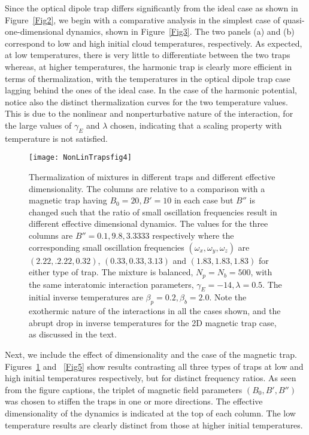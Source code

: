 \documentclass[pra,letterpaper,onecolumn,superscriptaddress,floatfix]{revtex4}
\begin{document}
Since the optical dipole trap differs significantly from the ideal case as shown in Figure~\ref{Fig2}, we begin 
with a comparative analysis in the simplest case of quasi-one-dimensional dynamics, shown in Figure~\ref{Fig3}.
The two panels (a) and (b) correspond to low and high initial cloud temperatures, respectively. 
As expected, at low temperatures, there is very little to differentiate between the two traps whereas, at higher 
temperatures, the harmonic trap is clearly more efficient in terms of thermalization, with the temperatures in 
the optical dipole trap case lagging behind the ones of the ideal case.  
In the case of the harmonic potential, notice also the distinct thermalization curves for the two temperature values. 
This is due to the nonlinear and nonperturbative nature of the interaction, for the large values of 
$\gamma_E$ and $\lambda$ chosen, indicating that a scaling property with temperature is not satisfied.

\begin{figure}[t]
\texttt{[image: NonLinTrapsfig4]}
\caption{Thermalization of mixtures in different traps and different effective dimensionality. 
The columns are relative to a comparison with a magnetic trap having $B_0=20, B'=10$ in each case but $B''$ is changed
such that the ratio of small oscillation frequencies result in different effective dimensional dynamics. The values
for the three columns are $B''=0.1, 9.8, 3.3333$ respectively where the corresponding small oscillation frequencies 
$(\omega_x,\omega_y,\omega_z)$ are $(2.22,.2.22,0.32)$, $(0.33,0.33,3.13)$ and $(1.83,1.83,1.83)$ for either type of trap. 
The mixture is balanced, $N_p=N_b=500$, with the same interatomic interaction parameters, $\gamma_E=-14, \lambda=0.5$. 
The initial inverse temperatures are $\beta_p= 0.2, \beta_b=2.0$. Note the exothermic nature of the interactions in all
the cases shown, and the abrupt drop in inverse temperatures for the 2D magnetic trap case, as discussed in the text. }
\label{Fig4}
\end{figure}

Next, we include the effect of dimensionality and the case of the magnetic trap.
Figures~\ref{Fig4} and ~\ref{Fig5} show results contrasting all three types of traps at low and high initial
temperatures respectively, but for distinct frequency ratios. As seen from the figure captions, the triplet  
of magnetic field parameters $(B_0, B', B'')$ was chosen to stiffen the traps in one or more directions. 
The effective dimensionality of the dynamics is indicated at the top of each column. 
The low temperature results are clearly distinct from those at higher initial temperatures. 
\end{document}
